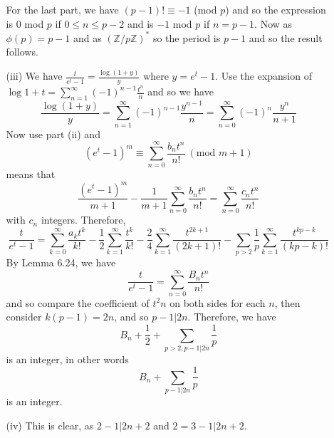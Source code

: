 \begin{enumerate}
\begin{enumerate}
     For the last part, we have $(p-1)! \equiv -1$ (mod $p$) and so
     the expression is $0$ mod $p$ if $0 \le n \le p-2$ and is
     $-1$ mod $p$ if $n=p-1$. Now as $\phi(p)=p-1$ and as $(\mathbb{Z}/p\mathbb{Z})^*$ so the period is
     $p-1$ and so the result follows.
     \item[(iii)] We have $\frac{t}{e^t-1}=\frac{\log{(1+y)}}{y}$ where $y=e^t-1$.
     Use the expansion of $\log{{1+t}}=\sum_{n=1}^\infty (-1)^{n-1}\frac{t^n}{n}$ and so we have
     $$\frac{\log{(1+y)}}{y}=\sum_{n=1}^\infty (-1)^{n-1}\frac{y^{n-1}}{n}
     =\sum_{n=0}^\infty (-1)^{n}\frac{y^{n}}{n+1}$$
     Now use part (ii) and
     $$(e^t-1)^m \equiv \sum_{n=0}^\infty \frac{b_n t^n}{n!}~(\text{mod }m+1)$$
     means that
     $$\frac{(e^t-1)^m}{m+1}-\frac{1}{m+1}\sum_{n=0}^\infty \frac{b_n t^n}{n!}=
     \sum_{n=0}^\infty \frac{c_n t^n}{n!}$$ with $c_n$ integers.
     Therefore,
     $$\frac{t}{e^t-1}=\sum_{k=0}^\infty \frac{a_k t^k}{k!}
     -\frac{1}{2}\sum_{k=1}^\infty \frac{t^k}{k!}-\frac{2}{4}\sum_{k=1}^\infty \frac{t^{2k+1}}{(2k+1)!}
     -\sum_{p>2}\frac{1}{p}\sum_{k=1}^\infty \frac{t^{kp-k}}{(kp-k)!}$$
     By Lemma 6.24, we have
     $$\frac{t}{e^t-1}=\sum_{n=0}^\infty \frac{B_n t^n}{n!}$$
     and so compare the coefficient of $t^2n$ on both sides for each $n$, then consider $k(p-1)=2n$,
     and so $p-1 \big| 2n$. Therefore, we have
     $$B_n+\frac{1}{2}+\sum_{p>2,p-1 \big| 2n}\frac{1}{p}$$ is an integer, in other words
     $$B_n+\sum_{p-1 \big|2n}\frac{1}{p}$$ is an integer.
     \item[(iv)] This is clear, as $2-1 \big|2n+2$ and $2=3-1 \big|2n+2$.
      \end{enumerate}
\end{enumerate}
